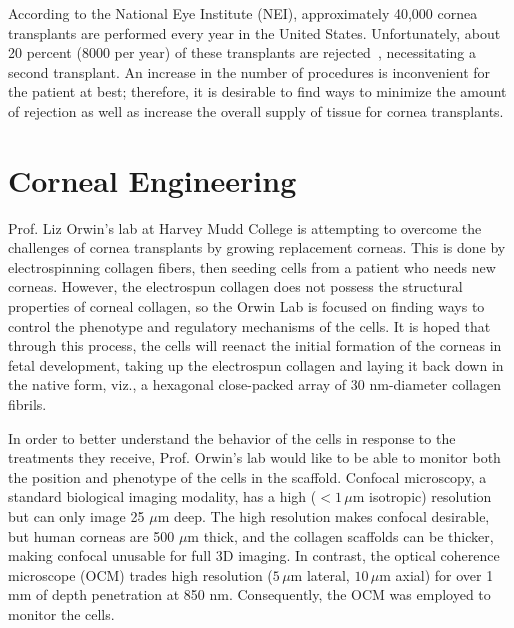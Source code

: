 According to the National Eye Institute (NEI), approximately 40,000 cornea transplants are performed every year in the United States. Unfortunately, about 20 percent (8000 per year) of these transplants are rejected~\citep{NEIcornea}, necessitating a second transplant. An increase in the number of procedures is inconvenient for the patient at best; therefore, it is desirable to find ways to minimize the amount of rejection as well as increase the overall supply of tissue for cornea transplants.

\section{Corneal Engineering}
\label{cornealengineering}

Prof. Liz Orwin's lab at Harvey Mudd College is attempting to overcome the challenges of cornea transplants by growing replacement corneas. This is done by electrospinning collagen fibers, then seeding cells from a patient who needs new corneas. However, the electrospun collagen does not possess the structural properties of corneal collagen, so the Orwin Lab is focused on finding ways to control the phenotype and regulatory mechanisms of the cells. It is hoped that through this process, the cells will reenact the initial formation of the corneas in fetal development, taking up the electrospun collagen and laying it back down in the native form, viz., a hexagonal close-packed array of 30 nm-diameter collagen fibrils.

In order to better understand the behavior of the cells in response to the treatments they receive, Prof. Orwin's lab would like to be able to monitor both the position and phenotype of the cells in the scaffold. Confocal microscopy, a standard biological imaging modality, has a high ($<1\,\mu$m isotropic) resolution but can only image 25 $\mu$m deep. The high resolution makes confocal desirable, but human corneas are 500 $\mu$m thick, and the collagen scaffolds can be thicker, making confocal unusable for full 3D imaging. In contrast, the optical coherence microscope (OCM) trades high resolution ($5\,\mu$m lateral, $10\,\mu$m axial) for over 1 mm of depth penetration at 850 nm. Consequently, the OCM was employed to monitor the cells.


